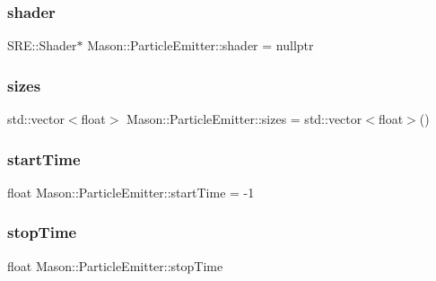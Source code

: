 \subsubsection{\texorpdfstring{shader}{shader}}
{\footnotesize\ttfamily S\+R\+E\+::\+Shader$\ast$ Mason\+::\+Particle\+Emitter\+::shader = nullptr\hspace{0.3cm}{\ttfamily [protected]}}

\hypertarget{class_mason_1_1_particle_emitter_a6209f3a86719de038574edafc0eaa194}{}\label{class_mason_1_1_particle_emitter_a6209f3a86719de038574edafc0eaa194} 
\subsubsection{\texorpdfstring{sizes}{sizes}}
{\footnotesize\ttfamily std\+::vector$<$float$>$ Mason\+::\+Particle\+Emitter\+::sizes = std\+::vector$<$float$>$()\hspace{0.3cm}{\ttfamily [protected]}}

\hypertarget{class_mason_1_1_particle_emitter_a46d4d3d2871daba6f320dfbc1f89ace1}{}\label{class_mason_1_1_particle_emitter_a46d4d3d2871daba6f320dfbc1f89ace1} 
\subsubsection{\texorpdfstring{start\+Time}{startTime}}
{\footnotesize\ttfamily float Mason\+::\+Particle\+Emitter\+::start\+Time = -\/1\hspace{0.3cm}{\ttfamily [protected]}}

\hypertarget{class_mason_1_1_particle_emitter_a63333da2d5eb945d62e428f980c27523}{}\label{class_mason_1_1_particle_emitter_a63333da2d5eb945d62e428f980c27523} 
\subsubsection{\texorpdfstring{stop\+Time}{stopTime}}
{\footnotesize\ttfamily float Mason\+::\+Particle\+Emitter\+::stop\+Time\hspace{0.3cm}{\ttfamily [protected]}}

